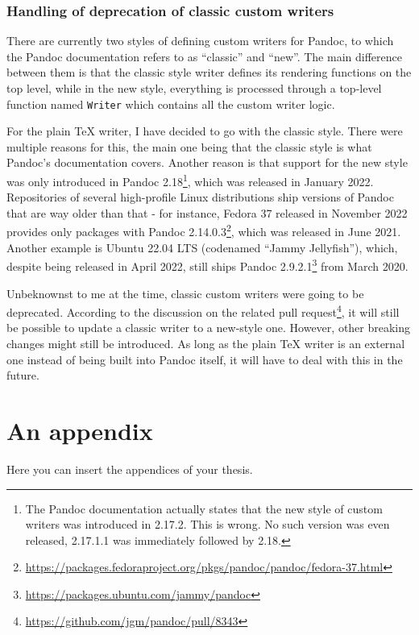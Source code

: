 \documentclass[
  digital,     %
  oneside,     %
  nosansbold,  %
  nocolorbold, %
  lof,         %
  lot,         %
]{fithesis4}
\begin{document}
\subsection{Handling of deprecation of classic custom writers}

There are currently two styles of defining custom writers for Pandoc, to which the Pandoc documentation refers to as ``classic'' and ``new''. The main difference between them is that the classic style writer defines its rendering functions on the top level, while in the new style, everything is processed through a top-level function named \texttt{Writer} which contains all the custom writer logic.

For the plain \TeX{} writer, I have decided to go with the classic style. There were multiple reasons for this, the main one being that the classic style is what Pandoc's documentation covers. Another reason is that support for the new style was only introduced in Pandoc 2.18\footnote{The Pandoc documentation actually states that the new style of custom writers was introduced in 2.17.2. This is wrong. No such version was even released, 2.17.1.1 was immediately followed by 2.18.}, which was released in January 2022. Repositories of several high-profile Linux distributions ship versions of Pandoc that are way older than that - for instance, Fedora 37 released in November 2022 provides only packages with Pandoc 2.14.0.3\footnote{\url{https://packages.fedoraproject.org/pkgs/pandoc/pandoc/fedora-37.html}}, which was released in June 2021. Another example is Ubuntu 22.04 LTS (codenamed ``Jammy Jellyfish''), which, despite being released in April 2022, still ships Pandoc 2.9.2.1\footnote{\url{https://packages.ubuntu.com/jammy/pandoc}} from March 2020.

Unbeknownst to me at the time, classic custom writers were going to be deprecated. According to the discussion on the related pull request\footnote{\url{https://github.com/jgm/pandoc/pull/8343}}, it will still be possible to update a classic writer to a new-style one. However, other breaking changes might still be introduced. As long as the plain \TeX{} writer is an external one instead of being built into Pandoc itself, it will have to deal with this in the future.

\printbibliography[heading=bibintoc] %

\makeatletter\thesis@blocks@clear\makeatother
{} %
\printindex

\appendix %
\chapter{An appendix}
Here you can insert the appendices of your thesis.
\end{document}
